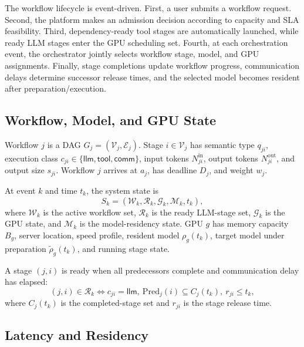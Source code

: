 \documentclass[10pt,conference]{IEEEtran}
\newcommand{\calW}{\mathcal{W}}
\newcommand{\calR}{\mathcal{R}}
\newcommand{\calG}{\mathcal{G}}
\newcommand{\calM}{\mathcal{M}}
\newcommand{\calV}{\mathcal{V}}
\newcommand{\calE}{\mathcal{E}}
\begin{document}
The workflow lifecycle is event-driven. First, a user submits a workflow request. Second, the platform makes an admission decision according to capacity and SLA feasibility. Third, dependency-ready tool stages are automatically launched, while ready LLM stages enter the GPU scheduling set. Fourth, at each orchestration event, the orchestrator jointly selects workflow stage, model, and GPU assignments. Finally, stage completions update workflow progress, communication delays determine successor release times, and the selected model becomes resident after preparation/execution.

\subsection{Workflow, Model, and GPU State}

Workflow \(j\) is a DAG \(G_j=(\calV_j,\calE_j)\). Stage \(i\in\calV_j\) has semantic type \(q_{ji}\), execution class \(c_{ji}\in\{\textsf{llm},\textsf{tool},\textsf{comm}\}\), input tokens \(N^{\mathrm{in}}_{ji}\), output tokens \(N^{\mathrm{out}}_{ji}\), and output size \(s_{ji}\). Workflow \(j\) arrives at \(a_j\), has deadline \(D_j\), and weight \(w_j\).

At event \(k\) and time \(t_k\), the system state is
\begin{equation}
S_k=\left(\calW_k,\calR_k,\calG_k,\calM_k,t_k\right),
\end{equation}
where \(\calW_k\) is the active workflow set, \(\calR_k\) is the ready LLM-stage set, \(\calG_k\) is the GPU state, and \(\calM_k\) is the model-residency state. GPU \(g\) has memory capacity \(B_g\), server location, speed profile, resident model \(\rho_g(t_k)\), target model under preparation \(\tilde\rho_g(t_k)\), and running stage state.

A stage \((j,i)\) is ready when all predecessors complete and communication delay has elapsed:
\begin{equation}
(j,i)\in\calR_k \Leftrightarrow c_{ji}=\textsf{llm},~
\mathrm{Pred}_j(i)\subseteq C_j(t_k),~r_{ji}\le t_k,
\end{equation}
where \(C_j(t_k)\) is the completed-stage set and \(r_{ji}\) is the stage release time.

\subsection{Latency and Residency}
\end{document}
